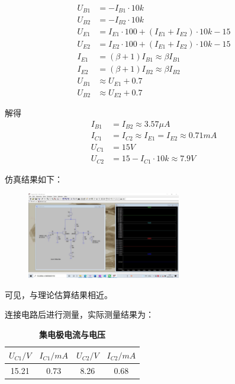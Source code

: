 \documentclass[UTF8]{ctexart}
\begin{document}
\begin{align}
    \nonumber
    U_{B1} &= - I_{B1} \cdot 10k \\
    \nonumber
    U_{B2} &= - I_{B2} \cdot 10k \\
    \nonumber
    U_{E1} &= I_{E1} \cdot 100 + (I_{E1} + I_{E2}) \cdot 10k - 15\\
    \nonumber
    U_{E2} &= I_{E2} \cdot 100 + (I_{E1} + I_{E2}) \cdot 10k - 15\\
    \nonumber
    I_{E1} &= (\beta + 1) I_{B1} \approx \beta I_{B1}\\
    \nonumber
    I_{E2} &= (\beta + 1) I_{B2} \approx \beta I_{B2}\\
    \nonumber
    U_{B1} &\approx U_{E1} + 0.7\\
    \nonumber
    U_{B2} &\approx U_{E2} + 0.7
\end{align}

解得
\begin{align}
    \nonumber
    I_{B1} &= I_{B2} \approx 3.57 \mu A \\
    \nonumber
    I_{C1} &= I_{C2} \approx I_{E1} = I_{E2} \approx 0.71 mA\\
    \nonumber
    U_{C1} &= 15V\\
    \nonumber
    U_{C2} &= 15 - I_{C1}\cdot 10k \approx 7.9V
\end{align}

仿真结果如下：

\begin{figure}[htbp]
    \centering
    \includegraphics[width=0.60\textwidth]{1-1-静态.jpg}
\end{figure}

可见，与理论估算结果相近。

连接电路后进行测量，实际测量结果为：

\begin{table}[H]
    \centering
    \caption{\label{表1}\textbf{集电极电流与电压}}
    \begin{tabular}{cccc}
    \toprule
        $U_{C1}/V$ & $I_{C1}/mA$ & $U_{C2}/V$ & $I_{C2}/mA$ \\
    \midrule
        15.21 & 0.73 & 8.26 & 0.68 \\
    \bottomrule
    \end{tabular}
\end{table}
\end{document}
